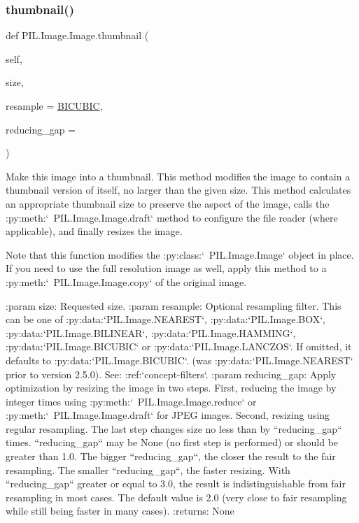 \subsubsection{\texorpdfstring{thumbnail()}{thumbnail()}}
{\footnotesize\ttfamily def P\+I\+L.\+Image.\+Image.\+thumbnail (\begin{DoxyParamCaption}\item[{}]{self,  }\item[{}]{size,  }\item[{}]{resample = {\ttfamily \hyperlink{namespacePIL_1_1Image_a3824ac5a0532aa60f7072af889d88e59}{B\+I\+C\+U\+B\+IC}},  }\item[{}]{reducing\+\_\+gap = {} }\end{DoxyParamCaption})}

\begin{DoxyVerb}Make this image into a thumbnail.  This method modifies the
image to contain a thumbnail version of itself, no larger than
the given size.  This method calculates an appropriate thumbnail
size to preserve the aspect of the image, calls the
:py:meth:`~PIL.Image.Image.draft` method to configure the file reader
(where applicable), and finally resizes the image.

Note that this function modifies the :py:class:`~PIL.Image.Image`
object in place.  If you need to use the full resolution image as well,
apply this method to a :py:meth:`~PIL.Image.Image.copy` of the original
image.

:param size: Requested size.
:param resample: Optional resampling filter.  This can be one
   of :py:data:`PIL.Image.NEAREST`, :py:data:`PIL.Image.BOX`,
   :py:data:`PIL.Image.BILINEAR`, :py:data:`PIL.Image.HAMMING`,
   :py:data:`PIL.Image.BICUBIC` or :py:data:`PIL.Image.LANCZOS`.
   If omitted, it defaults to :py:data:`PIL.Image.BICUBIC`.
   (was :py:data:`PIL.Image.NEAREST` prior to version 2.5.0).
   See: :ref:`concept-filters`.
:param reducing_gap: Apply optimization by resizing the image
   in two steps. First, reducing the image by integer times
   using :py:meth:`~PIL.Image.Image.reduce` or
   :py:meth:`~PIL.Image.Image.draft` for JPEG images.
   Second, resizing using regular resampling. The last step
   changes size no less than by ``reducing_gap`` times.
   ``reducing_gap`` may be None (no first step is performed)
   or should be greater than 1.0. The bigger ``reducing_gap``,
   the closer the result to the fair resampling.
   The smaller ``reducing_gap``, the faster resizing.
   With ``reducing_gap`` greater or equal to 3.0, the result is
   indistinguishable from fair resampling in most cases.
   The default value is 2.0 (very close to fair resampling
   while still being faster in many cases).
:returns: None
\end{DoxyVerb}
 \mbox{\label{classPIL_1_1Image_1_1Image_a84e4d4559675e892abf31b9940a92dbb}} 
